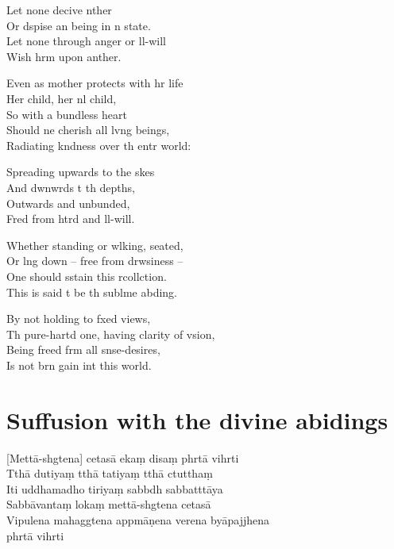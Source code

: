 
\clearpage

Let none decive nther\\%
Or dspise an being in n state.\\
Let none through anger or ll-will\\
Wish hrm upon anther.

Even as  mother protects with hr life\\
Her child, her nl child,\\
So with a bundless heart\\
Should ne cherish all lvng beings,\\
Radiating kndness over th entr world:

Spreading upwards to the skes\\
And dwnwrds t th depths,\\
Outwards and unbunded,\\
Fred from htrd and ll-will.

Whether standing or wlking, seated, \\
Or lng down -- free from drwsiness --\\
One should sstain this rcollction.\\
This is said t be th sublme abding.

By not holding to fxed views,\\
Th pure-hartd one, having clarity of vsion,\\
Being freed frm all snse-desires,\\
Is not brn gain int this world.

\clearpage

\chapter[Divine abidings]{Suffusion with the divine abidings}%

\begin{leader}
\end{leader}

[Mettā-shgtena] cetasā ekaṃ disaṃ phrtā vihrti\\
Tthā dutiyaṃ tthā tatiyaṃ tthā ctutthaṃ\\
Iti uddhamadho tiriyaṃ sabbdh sabbatttāya\\
Sabbāvantaṃ lokaṃ mettā-shgtena cetasā\\
Vipulena mahaggtena appmāṇena verena byāpajjhena\\
\vin phrtā vihrti

